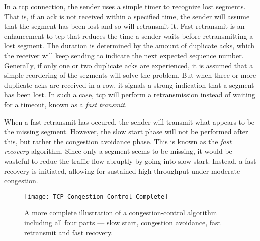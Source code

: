 In a \gls{tcp} connection, the sender uses a simple timer to recognize lost segments. That is, if an \gls{ack} is not received within a specified time, the sender will assume that the segment has been lost and so will retransmit it. Fast retransmit is an enhancement to \gls{tcp} that reduces the time a sender waits before retransmitting a lost segment. The duration is determined by the amount of duplicate \gls{ack}s, which the receiver will keep sending to indicate the next expected sequence number. Generally, if only one or two duplicate \gls{ack}s are experienced, it is assumed that a simple reordering of the segments will solve the problem. But when three or more duplicate \gls{ack}s are received in a row, it signals a strong indication that a segment has been lost. In such a case, \gls{tcp} will perform a retransmission instead of waiting for a timeout, known as a \textit{fast transmit}.

When a fast retransmit has occured, the sender will transmit what appears to be the missing segment. However, the slow start phase will not be performed after this, but rather the congestion avoidance phase. This is known as the \textit{fast recovery} algorithm. Since only a segment seems to be missing, it would be wasteful to redue the traffic flow abruptly by going into slow start. Instead, a fast recovery is initiated, allowing for sustained high throughput under moderate congestion.

\begin{figure}[H]
    \centering
    \texttt{[image: TCP\_Congestion\_Control\_Complete]}
    \captionsetup{width=0.6\textwidth}
    \caption{A more complete illustration of a congestion-control algorithm including all four parts --- slow start, congestion avoidance, fast retransmit and fast recovery. }
\end{figure}









